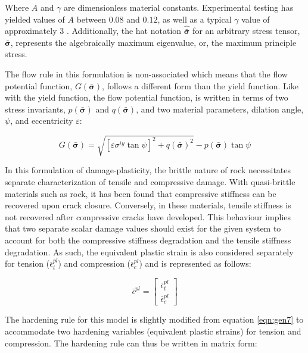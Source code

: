 Where $A$ and $\gamma$ are dimensionless material constants. Experimental testing has yielded values of $A$ between $0.08$ and $0.12$, as well as a typical $\gamma$ value of approximately $3$ \cite{lubliner_plastic-damage_1989}. Additionally, the hat notation $\hat{\bar{\boldsymbol{\sigma}}}$ for an arbitrary stress tensor, $\bar{\boldsymbol{\sigma}}$, represents the algebraically maximum eigenvalue, or, the maximum principle stress.

The flow rule in this formulation is non-associated which means that the flow potential function, $G\left(\bar{\boldsymbol{\sigma}}\right)$, follows a different form than the yield function. Like with the yield function, the flow potential function, is written in terms of two stress invariants, $p\left(\bar{\boldsymbol{\sigma}}\right)$ and $q\left(\bar{\boldsymbol{\sigma}}\right)$, and two material parameters, dilation angle, $\psi$, and eccentricity $\varepsilon$:

\begin{equation}
G\left(\bar{\boldsymbol{\sigma}}\right)=\sqrt{\left[\varepsilon\sigma^{iy}\tan\psi\right]^{2}+q\left(\bar{\boldsymbol{\sigma}}\right)^{2}}-p\left(\bar{\boldsymbol{\sigma}}\right)\tan\psi\label{eqn:const11c}
\end{equation}

In this formulation of damage-plasticity, the brittle nature of rock necessitates separate characterization of tensile and compressive damage. With quasi-brittle materials such as rock, it has been found that compressive stiffness can be recovered upon crack closure. Conversely, in these materials, tensile stiffness is not recovered after compressive cracks have developed. This behaviour implies that two separate scalar damage values should exist for the given system to account for both the compressive stiffness degradation and the tensile stiffness degradation. As such, the equivalent plastic strain is also considered separately for tension ($\bar{\epsilon}_{t}^{pl}$) and compression ($\bar{\epsilon}_{c}^{pl}$) and is represented as follows: 

\begin{equation}
\bar{\epsilon}^{pl}=
\left[
\begin{array}{c}
    \bar{\epsilon}_{t}^{pl}\\
    \bar{\epsilon}_{c}^{pl}
\end{array}
\right]
\label{eqn:const9}
\end{equation}

The hardening rule for this model is slightly modified from equation \ref{eqn:gen7} to accommodate two hardening variables (equivalent plastic strains) for tension and compression. The hardening rule can thus be written in matrix form:

